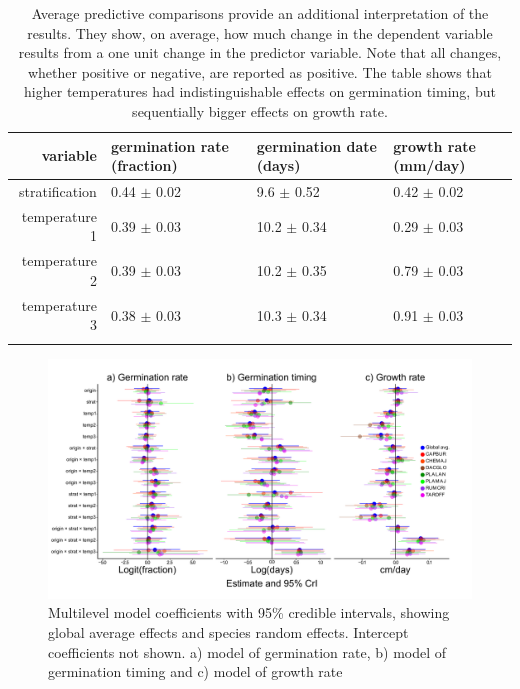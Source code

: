 \documentclass[12pt]{article}\usepackage[]{graphicx}\usepackage[]{color}
\begin{document}
\begin{longtable}{rlll} 
\caption{Average predictive comparisons provide an additional interpretation of the results. They show, on average, how much change in the dependent variable results from a one unit change in the predictor variable. Note that all changes, whether positive or negative, are reported as positive. The table shows that higher temperatures had indistinguishable effects on germination timing, but sequentially bigger effects on growth rate.}
\label{tab:apc}\\
	\hline
	variable & germination rate (fraction) & germination date (days) & growth rate (mm/day) \\ 
	\hline
	stratification & 0.44 $\pm$ 0.02 & 9.6 $\pm$ 0.52 & 0.42 $\pm$ 0.02 \\ 
	temperature 1 & 0.39 $\pm$ 0.03 & 10.2 $\pm$ 0.34 & 0.29 $\pm$ 0.03 \\ 
	temperature 2 & 0.39 $\pm$ 0.03 & 10.2 $\pm$ 0.35 & 0.79 $\pm$ 0.03 \\ 
	temperature 3 & 0.38 $\pm$ 0.03 & 10.3 $\pm$ 0.34 & 0.91 $\pm$ 0.03 \\ 
	\hline\\
	\hline
\end{longtable}

\begin{figure}
\centering
	\includegraphics[scale=.7]{germ_figs_onepage.pdf}
	\caption{Multilevel model coefficients with 95\% credible intervals, showing global average effects and species random effects. Intercept coefficients not shown.  a) model of germination rate, b) model of germination timing and c) model of growth rate}
	\label{fig:coef}
\end{figure}
\end{document}
